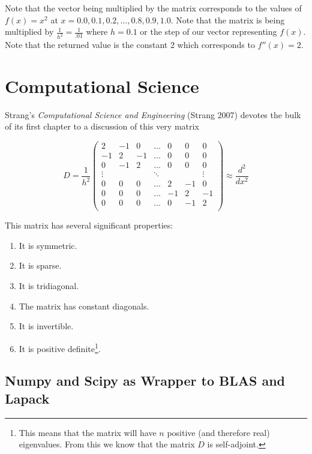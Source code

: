 \documentclass[12pt,]{book}
\providecommand{\tightlist}{%
  \setlength{\itemsep}{0pt}\setlength{\parskip}{0pt}}
\begin{document}
Note that the vector being multiplied by the matrix corresponds to the
values of \(f(x)=x^2\) at \(x=0.0,0.1,0.2,\dots,0.8,0.9,1.0\). Note that
the matrix is being multiplied by \(\frac{1}{h^2}=\frac{1}{.01}\) where
\(h=0.1\) or the step of our vector representing \(f(x)\). Note that the
returned value is the constant 2 which corresponds to \(f''(x)=2\).

\section{Computational Science}\label{computational-science}

Strang's \emph{Computational Science and Engineering} (Strang 2007)
devotes the bulk of its first chapter to a discussion of this very
matrix

\[D = 
\frac{1}{h^2}\left(\begin{matrix}
 2 & -1 &  0 & \dots &  0 &  0 &  0 \\
-1 &  2 & -1 & \dots &  0 &  0 &  0 \\
 0 & -1 &  2 & \dots &  0 &  0 &  0 \\
\vdots & \ & \ & \ddots & \ & \ & \vdots \\
 0 &  0 &  0 & \dots &  2 & -1 &  0 \\
 0 &  0 &  0 & \dots & -1 &  2 & -1 \\
 0 &  0 &  0 & \dots &  0 & -1 &  2 \\
\end{matrix}\right)\approx\frac{d^2}{dx^2}
\]

This matrix has several significant properties:

\begin{enumerate}
\def\labelenumi{\arabic{enumi}.}
\tightlist
\item
  It is symmetric.
\item
  It is sparse.
\item
  It is tridiagonal.
\item
  The matrix has constant diagonals.
\item
  It is invertible.
\item
  It is positive
  definite\footnote{This means that the matrix will have $n$ positive (and therefore real) eigenvalues. From this we know that the matrix $D$ is self-adjoint.}.
\end{enumerate}

\subsection{Numpy and Scipy as Wrapper to BLAS and
Lapack}\label{numpy-and-scipy-as-wrapper-to-blas-and-lapack}
\end{document}
